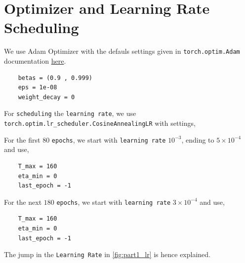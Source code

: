 \section{Optimizer and Learning Rate Scheduling}



We use Adam Optimizer with the defauls settings given in \verb|torch.optim.Adam| documentation \href{https://pytorch.org/docs/stable/generated/torch.optim.Adam.html}{here}.
\begin{verbatim}
    betas = (0.9 , 0.999)
    eps = 1e-08
    weight_decay = 0
\end{verbatim}

For \verb|scheduling| the \verb|learning rate|, we use \verb|torch.optim.lr_scheduler.CosineAnnealingLR| with settings,

For the first $80$ \verb|epochs|, we start with \verb|learning rate| $10^{-3}$, ending to $5 \times 10^{-4}$ and use,
\begin{verbatim}
    T_max = 160
    eta_min = 0
    last_epoch = -1
\end{verbatim}

For the next $180$ \verb|epochs|, we start with \verb|learning rate| $3 \times 10^{-4}$ and use,
\begin{verbatim}
    T_max = 160
    eta_min = 0
    last_epoch = -1
\end{verbatim}

The jump in the \verb|Learning Rate| in \autoref{fig:part1_lr} is hence explained.
 

